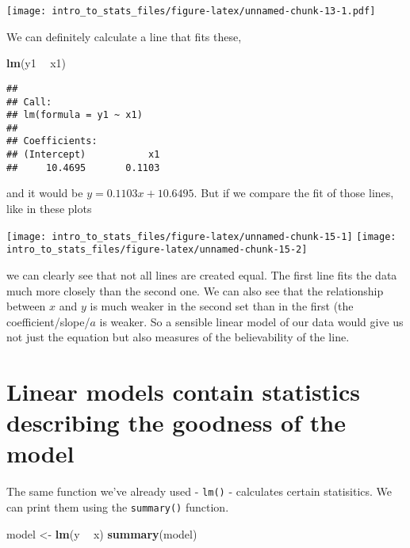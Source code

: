 \documentclass[]{book}
\newenvironment{Shaded}{\begin{snugshade}}{\end{snugshade}}
\newcommand{\KeywordTok}[1]{\textcolor[rgb]{0.13,0.29,0.53}{\textbf{#1}}}
\newcommand{\NormalTok}[1]{#1}
\newcommand{\OperatorTok}[1]{\textcolor[rgb]{0.81,0.36,0.00}{\textbf{#1}}}
\newcommand{\StringTok}[1]{\textcolor[rgb]{0.31,0.60,0.02}{#1}}
\begin{document}
\texttt{[image: intro\_to\_stats\_files/figure-latex/unnamed-chunk-13-1.pdf]}

We can definitely calculate a line that fits these,

\begin{Shaded}
\begin{Highlighting}[]
\KeywordTok{lm}\NormalTok{(y1 }\OperatorTok{~}\StringTok{ }\NormalTok{x1)}
\end{Highlighting}
\end{Shaded}

\begin{verbatim}
## 
## Call:
## lm(formula = y1 ~ x1)
## 
## Coefficients:
## (Intercept)           x1  
##     10.4695       0.1103
\end{verbatim}

and it would be \(y = 0.1103x + 10.6495\). But if we compare the fit of those lines, like in these plots

\texttt{[image: intro\_to\_stats\_files/figure-latex/unnamed-chunk-15-1]} \texttt{[image: intro\_to\_stats\_files/figure-latex/unnamed-chunk-15-2]}

we can clearly see that not all lines are created equal. The first line fits the data much more closely than the second one. We can also see that the relationship between \(x\) and \(y\) is much weaker in the second set than in the first (the coefficient/slope/\(a\) is weaker. So a sensible linear model of our data would give us not just the equation but also measures of the believability of the line.

\hypertarget{linear-models-contain-statistics-describing-the-goodness-of-the-model}{%
\section{Linear models contain statistics describing the goodness of the model}\label{linear-models-contain-statistics-describing-the-goodness-of-the-model}}

The same function we've already used - \texttt{lm()} - calculates certain statisitics. We can print them using the \texttt{summary()} function.

\begin{Shaded}
\begin{Highlighting}[]
\NormalTok{model <-}\StringTok{ }\KeywordTok{lm}\NormalTok{(y }\OperatorTok{~}\StringTok{ }\NormalTok{x)}
\KeywordTok{summary}\NormalTok{(model)}
\end{Highlighting}
\end{Shaded}
\end{document}
